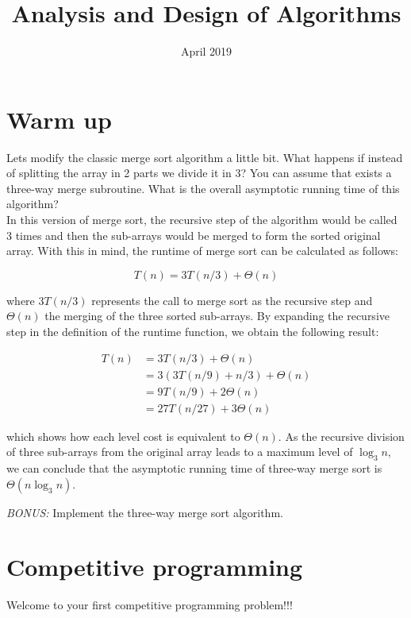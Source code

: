 \documentclass[12pt]{article}
\title{Analysis and Design of Algorithms}
\author{}
\date{April 2019}
\begin{document}
\maketitle

\section{Warm up}

Lets modify the classic merge sort algorithm a little bit. What happens if instead of splitting the array in 2 parts we divide it in 3? You can assume that exists a three-way merge subroutine. What is the overall asymptotic running time of this algorithm?\\

In this version of merge sort, the recursive step of the algorithm would be called 3 times and then the sub-arrays would be merged to form the sorted original array. With this in mind, the runtime of merge sort can be calculated as follows:

\[T(n) = 3 T(n / 3) +  \Theta(n)\]

where $3 T(n / 3)$ represents the call to merge sort as the recursive step and $ \Theta(n)$ the merging of the three sorted sub-arrays. By expanding the recursive step in the definition of the runtime function, we obtain the following result:

\begin{align*}
T(n) &= 3 T(n / 3) +  \Theta(n)\\
&= 3 (3 T(n / 9) + n / 3) +  \Theta(n)\\
&= 9 T(n / 9) + 2  \Theta(n)\\
&= 27 T(n / 27) + 3  \Theta(n)
\end{align*}

which shows how each level cost is equivalent to $ \Theta(n)$. As the recursive division of three sub-arrays from the original array leads to a maximum level of $\log_3 n$, we can conclude that the asymptotic running time of three-way merge sort is $\Theta (n\log_3 n)$.

\emph{BONUS:} Implement the three-way merge sort algorithm.

\section{Competitive programming}

Welcome to your first competitive programming problem!!! 
\end{document}
